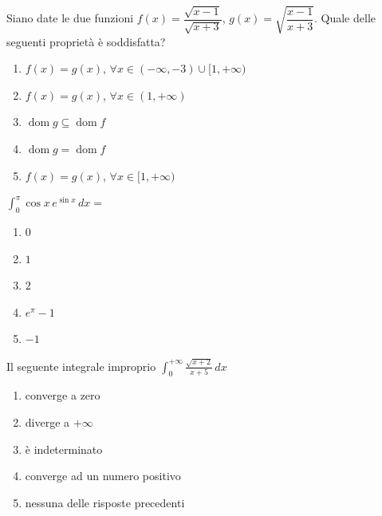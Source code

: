 \begin{quiz}
Siano date le due funzioni $f(x)=\dfrac{\sqrt{x-1}}{\sqrt{x+3}}$, $g(x)=\sqrt{\dfrac{x-1}{x+3}}$. Quale delle seguenti propriet\`a \`e soddisfatta?
\begin{enumerate}
\item $f(x)=g(x)$, $\forall x\in(-\infty,-3)\cup[1,+\infty)$
\item $f(x)=g(x)$, $\forall x\in(1,+\infty)$
\item $\operatorname{dom}g\subseteq\operatorname{dom}f$
\item $\operatorname{dom}g=\operatorname{dom}f$
\item $f(x)=g(x)$, $\forall x\in[1,+\infty)$
\end{enumerate}
\end{quiz}

\begin{quiz}
$\displaystyle\int_0^\pi\cos x\,e^{\sin x}\,dx=$
\begin{enumerate}
\item $0$
\item $1$
\item $2$
\item $e^\pi-1$
\item $-1$
\end{enumerate}
\end{quiz}

\begin{quiz}
Il seguente integrale improprio $\displaystyle\int_0^{+\infty}\frac{\sqrt{x+2}}{x+5}\,dx$
\begin{enumerate}
\item converge a zero
\item diverge a $+\infty$
\item \`e indeterminato
\item converge ad un numero positivo
\item nessuna delle risposte precedenti
\end{enumerate}
\end{quiz}

